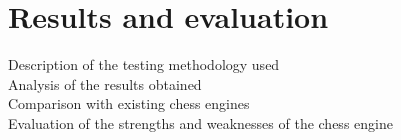 \chapter{Results and evaluation}
\label{chap:ch5}

Description of the testing methodology used\\
Analysis of the results obtained\\
Comparison with existing chess engines\\
Evaluation of the strengths and weaknesses of the chess engine